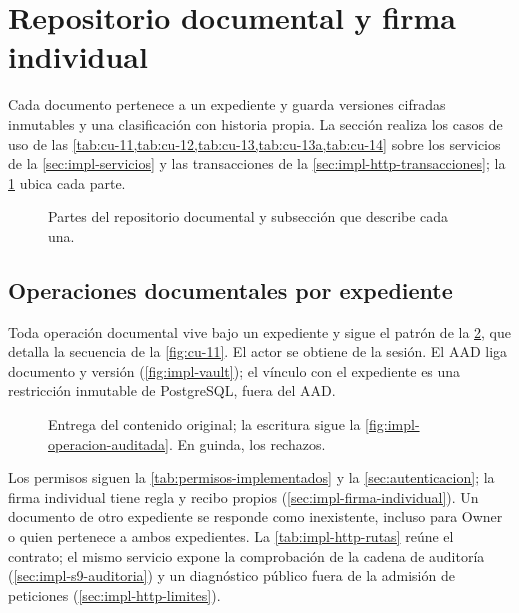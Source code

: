 
\section{Repositorio documental y firma individual}\label{sec:impl-documentos}

Cada documento pertenece a un expediente y guarda versiones cifradas inmutables y una clasificación con historia propia. La sección realiza los casos de uso de las \cref{tab:cu-11,tab:cu-12,tab:cu-13,tab:cu-13a,tab:cu-14} sobre los servicios de la \cref{sec:impl-servicios} y las transacciones de la \cref{sec:impl-http-transacciones}; la \cref{fig:impl-doc-panorama} ubica cada parte.

\begin{figure}[!htbp]
  \centering
  
  \caption{Partes del repositorio documental y subsección que describe cada una.}
  \label{fig:impl-doc-panorama}
\end{figure}

\subsection{Operaciones documentales por expediente}\label{sec:impl-http-documentos}

Toda operación documental vive bajo un expediente y sigue el patrón de la \cref{fig:impl-doc-operacion}, que detalla la secuencia de la \cref{fig:cu-11}. El actor se obtiene de la sesión. El AAD liga documento y versión (\cref{fig:impl-vault}); el vínculo con el expediente es una restricción inmutable de PostgreSQL, fuera del AAD.

\begin{figure}[t]
  \centering
  
  \caption{Entrega del contenido original; la escritura sigue la \cref{fig:impl-operacion-auditada}. En guinda, los rechazos.}
  \label{fig:impl-doc-operacion}
\end{figure}

Los permisos siguen la \cref{tab:permisos-implementados} y la \cref{sec:autenticacion}; la firma individual tiene regla y recibo propios (\cref{sec:impl-firma-individual}). Un documento de otro expediente se responde como inexistente, incluso para Owner o quien pertenece a ambos expedientes. La \cref{tab:impl-http-rutas} reúne el contrato; el mismo servicio expone la comprobación de la cadena de auditoría (\cref{sec:impl-s9-auditoria}) y un diagnóstico público fuera de la admisión de peticiones (\cref{sec:impl-http-limites}).

